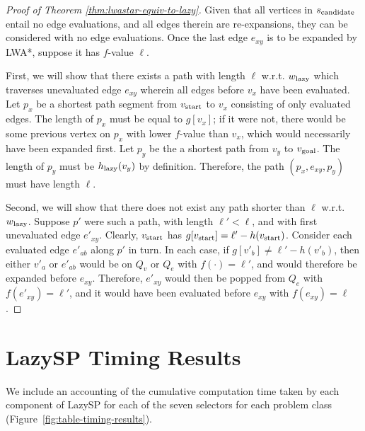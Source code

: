 \begin{proof}[Proof of Theorem \ref{thm:lwastar-equiv-to-lazy}]
Given that all vertices in $s_{\mbox{\scriptsize candidate}}$ entail no edge evaluations,
and all edges therein are re-expansions,
they can be considered with no edge evaluations.
Once the last edge $e_{xy}$ is to be expanded by LWA*,
suppose it has $f$-value $\ell$.

First,
we will show that there exists a path with length $\ell$ w.r.t.
$w_{\mbox{\scriptsize lazy}}$
which traverses unevaluated edge $e_{xy}$
wherein all edges before $v_x$ have been evaluated.
Let $p_x$ be a shortest path segment from $v_{\mbox{\scriptsize start}}$
to $v_x$ consisting of only evaluated edges.
The length of $p_x$ must be equal to $g[v_x]$;
if it were not,
there would be some previous vertex on $p_x$ with lower $f$-value
than $v_x$,
which would necessarily have been expanded first.
Let $p_y$ be the a shortest path from $v_y$
to $v_{\mbox{\scriptsize goal}}$.
The length of $p_y$ must be $h_{\mbox{\scriptsize lazy}}(v_y)$
by definition.
Therefore, the path $(p_x, e_{xy}, p_y)$ must have length $\ell$.

Second,
we will show that there does not exist any path shorter than $\ell$
w.r.t. $w_{\mbox{\scriptsize lazy}}$.
Suppose $p'$ were such a path, with length $\ell' < \ell$,
and with first unevaluated edge $e'_{xy}$.
Clearly, $v_{\mbox{\scriptsize start}}$ has
$g[v_{\mbox{\scriptsize start}}] = \ell' - h(v_{\mbox{\scriptsize start}})$.
Consider each evaluated edge $e'_{ab}$ along $p'$ in turn.
In each case,
if $g[v'_b] \neq \ell' - h(v'_b)$,
then either $v'_a$ or $e'_{ab}$ would be on $Q_v$ or $Q_e$
with $f(\cdot) = \ell'$,
and would therefore be expanded before $e_{xy}$.
Therefore,
$e'_{xy}$ would then be popped from $Q_e$ with $f(e'_{xy}) = \ell'$,
and it would have been evaluated before $e_{xy}$ with $f(e_{xy}) = \ell$.
\end{proof}

\section{LazySP Timing Results}
\label{sec:appendix-timing}

We include an accounting of the cumulative computation time taken by
each component of LazySP for each of the seven selectors
for each problem class (Figure~\ref{fig:table-timing-results}).

